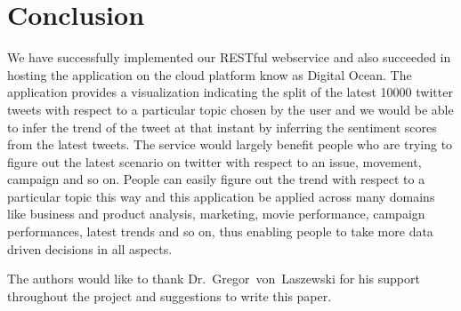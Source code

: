 \section{Conclusion}
We have successfully implemented our RESTful webservice and also succeeded in 
hosting the application on the cloud platform know as Digital Ocean. The 
application provides a visualization indicating the split of the latest 10000 
twitter tweets with respect to a particular topic chosen by the user and we 
would be able to infer the trend of the tweet at that instant by inferring the 
sentiment scores from the latest tweets. The service would 
largely benefit people who are trying to figure out the latest scenario on 
twitter with respect to an issue, movement, campaign and so on. People can 
easily figure out the trend with respect to a particular topic this way and 
this application be applied across many domains like business and product 
analysis, marketing, movie performance, campaign performances, latest trends 
and so on, thus enabling people to take more data driven decisions in all 
aspects.

\begin{acks}

	The authors would like to thank Dr.~Gregor~von~Laszewski for his
	support throughout the project and suggestions to write this paper.

\end{acks}


 
